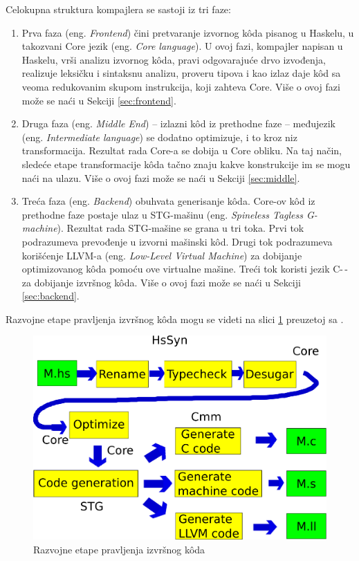 Celokupna struktura kompajlera se sastoji iz tri faze:
\begin{enumerate}
	\item Prva faza (eng. \emph{Frontend}) čini pretvaranje izvornog k\^{o}da pisanog u Haskelu, u takozvani Core jezik (eng. \emph {Core language}). U ovoj fazi, kompajler napisan u Haskelu, vrši analizu izvornog k\^{o}da, pravi odgovarajuće drvo izvođenja, realizuje leksičku i sintaksnu analizu, proveru tipova i kao izlaz daje k\^{o}d sa veoma redukovanim skupom instrukcija, koji zahteva Core. Više o ovoj fazi može se naći u Sekciji \ref{sec:frontend}.
	\item Druga faza (eng. \emph {Middle End}) – izlazni k\^{o}d iz prethodne faze – međujezik (eng. \emph {Intermediate language}) se dodatno optimizuje, i to kroz niz transformacija. Rezultat rada Core-a se dobija u Core obliku. Na taj način, sledeće etape transformacije k\^{o}da tačno znaju kakve konstrukcije im se mogu naći na ulazu.  Više o ovoj fazi može se naći u Sekciji \ref{sec:middle}.
	\item Treća faza (eng. \emph {Backend}) obuhvata generisanje k\^{o}da. Core-ov k\^{o}d iz prethodne faze postaje ulaz u STG-mašinu (eng. \emph {Spineless Tagless G-machine}). Rezultat rada STG-mašine se grana u tri toka. Prvi tok podrazumeva prevođenje u izvorni mašinski k\^{o}d. Drugi tok podrazumeva korišćenje LLVM-a (eng. \emph{Low-Level Virtual Machine}) za dobijanje optimizovanog k\^{o}da pomoću ove virtualne mašine. Treći tok koristi jezik C-\,- za dobijanje izvršnog k\^{o}da. Više o ovoj fazi može se naći u Sekciji \ref{sec:backend}.
\end{enumerate}

Razvojne etape pravljenja izvršnog k\^{o}da mogu se videti na slici \ref{fig:razvojneEtaple} preuzetoj sa \cite{StanfordGHC}.

\begin{figure}[h!]
	\begin{center}
		\includegraphics[scale=0.30]{resources/razvojneEtape.png}
	\end{center}
	\caption{Razvojne etape pravljenja izvršnog k\^{o}da}
	\label{fig:razvojneEtaple}
\end{figure}